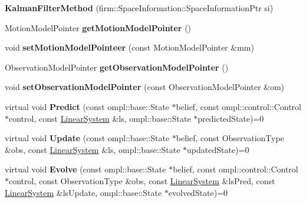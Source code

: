 \begin{DoxyCompactItemize}
\item 
\hypertarget{class_kalman_filter_method_afbea7fdb6e6faffd74de8ee647b97a02}{{\bfseries \-Kalman\-Filter\-Method} (firm\-::\-Space\-Information\-::\-Space\-Information\-Ptr si)}\label{class_kalman_filter_method_afbea7fdb6e6faffd74de8ee647b97a02}

\item 
\hypertarget{class_kalman_filter_method_aed467f00719c58d7be5458f8f99511d9}{\-Motion\-Model\-Pointer {\bfseries get\-Motion\-Model\-Pointer} ()}\label{class_kalman_filter_method_aed467f00719c58d7be5458f8f99511d9}

\item 
\hypertarget{class_kalman_filter_method_a7f2542d72d92f1e44cf4d0cdcaec02b8}{void {\bfseries set\-Motion\-Model\-Pointeer} (const \-Motion\-Model\-Pointer \&mm)}\label{class_kalman_filter_method_a7f2542d72d92f1e44cf4d0cdcaec02b8}

\item 
\hypertarget{class_kalman_filter_method_aa93f7e7e297eb337cc1fda8ae46763cc}{\-Observation\-Model\-Pointer {\bfseries get\-Observation\-Model\-Pointer} ()}\label{class_kalman_filter_method_aa93f7e7e297eb337cc1fda8ae46763cc}

\item 
\hypertarget{class_kalman_filter_method_a4b966a487acbbdda0f145be9a1da03d5}{void {\bfseries set\-Observation\-Model\-Pointer} (const \-Observation\-Model\-Pointer \&om)}\label{class_kalman_filter_method_a4b966a487acbbdda0f145be9a1da03d5}

\item 
\hypertarget{class_kalman_filter_method_a60d4e0a2eb06676f48727e21d33eb31f}{virtual void {\bfseries \-Predict} (const ompl\-::base\-::\-State $\ast$belief, const ompl\-::control\-::\-Control $\ast$control, const \hyperlink{class_linear_system}{\-Linear\-System} \&ls, ompl\-::base\-::\-State $\ast$predicted\-State)=0}\label{class_kalman_filter_method_a60d4e0a2eb06676f48727e21d33eb31f}

\item 
\hypertarget{class_kalman_filter_method_af79c09c56a2f81c1af8896f235d37afd}{virtual void {\bfseries \-Update} (const ompl\-::base\-::\-State $\ast$belief, const \-Observation\-Type \&obs, const \hyperlink{class_linear_system}{\-Linear\-System} \&ls, ompl\-::base\-::\-State $\ast$updated\-State)=0}\label{class_kalman_filter_method_af79c09c56a2f81c1af8896f235d37afd}

\item 
\hypertarget{class_kalman_filter_method_a9e56fcd80484eb15d50597b528bc6da9}{virtual void {\bfseries \-Evolve} (const ompl\-::base\-::\-State $\ast$belief, const ompl\-::control\-::\-Control $\ast$control, const \-Observation\-Type \&obs, const \hyperlink{class_linear_system}{\-Linear\-System} \&ls\-Pred, const \hyperlink{class_linear_system}{\-Linear\-System} \&ls\-Update, ompl\-::base\-::\-State $\ast$evolved\-State)=0}\label{class_kalman_filter_method_a9e56fcd80484eb15d50597b528bc6da9}


\end{DoxyCompactItemize}
